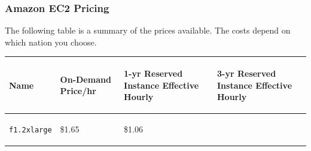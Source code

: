 \documentclass[a4paper]{article}
\begin{document}
    \subsubsection{Amazon EC2 Pricing}
    
    The following table is a summary of the prices available. The costs depend on which nation you choose.

    \begin{table}[!htp]
        \centering
        \begin{tabular}{@{} p{5em} p{7em} p{10em} p{10em} @{}}
            \toprule
            \begin{center}
                \textbf{Name}
            \end{center}
            & \begin{center}
                \vspace{-1.5em}
                \textbf{On-Demand Price/hr}
                \vspace{-1em}
            \end{center} 
            & \begin{center}
                \vspace{-1.5em}
                \textbf{1-yr Reserved Instance Effective Hourly}
                \vspace{-1em}
            \end{center}
            & \begin{center}
                \vspace{-1.5em}
                \textbf{3-yr Reserved Instance Effective Hourly}
                \vspace{-1em}
            \end{center} \\
            \midrule
            \begin{center}
                \vspace{-1.9em}
                \texttt{f1.2xlarge}
            \end{center} &
            \begin{center}
                \vspace{-1.5em}
                \$1.65
            \end{center} & 
            \begin{center}
                \vspace{-1.5em}
                \$1.06
            \end{center} & 
            \begin{center}

\end{center}
\end{tabular}
\end{table}
\end{document}
